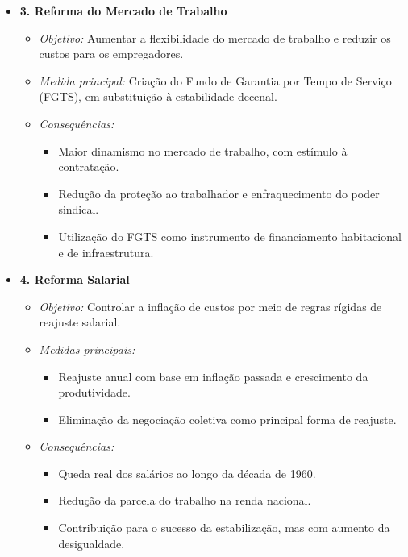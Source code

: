 \documentclass[a4paper,12pt]{article}[abntex2]
\begin{document}
\begin{itemize}
    \item \textbf{3. Reforma do Mercado de Trabalho}
    \begin{itemize}
        \item \textit{Objetivo:} Aumentar a flexibilidade do mercado de trabalho e reduzir os custos para os empregadores.
        \item \textit{Medida principal:} Criação do Fundo de Garantia por Tempo de Serviço (FGTS), em substituição à estabilidade decenal.
        \item \textit{Consequências:}
        \begin{itemize}
            \item Maior dinamismo no mercado de trabalho, com estímulo à contratação.
            \item Redução da proteção ao trabalhador e enfraquecimento do poder sindical.
            \item Utilização do FGTS como instrumento de financiamento habitacional e de infraestrutura.
        \end{itemize}
    \end{itemize}

    \item \textbf{4. Reforma Salarial}
    \begin{itemize}
        \item \textit{Objetivo:} Controlar a inflação de custos por meio de regras rígidas de reajuste salarial.
        \item \textit{Medidas principais:}
        \begin{itemize}
            \item Reajuste anual com base em inflação passada e crescimento da produtividade.
            \item Eliminação da negociação coletiva como principal forma de reajuste.
        \end{itemize}
        \item \textit{Consequências:}
        \begin{itemize}
            \item Queda real dos salários ao longo da década de 1960.
            \item Redução da parcela do trabalho na renda nacional.
            \item Contribuição para o sucesso da estabilização, mas com aumento da desigualdade.
        \end{itemize}
    \end{itemize}
\end{itemize}
\end{document}
